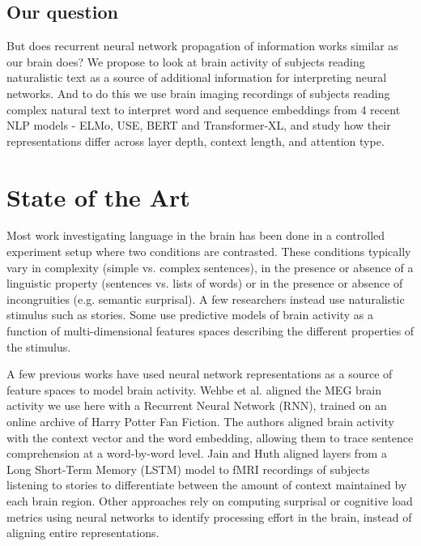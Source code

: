 \documentclass{article}
\begin{document}
\subsection{Our question}
But does recurrent neural network propagation of information works similar as our brain does? We propose to look at brain activity of subjects reading naturalistic text as a source of additional information for interpreting neural networks. And to do this we use brain imaging recordings of subjects reading complex natural text to interpret word and sequence embeddings from 4 recent NLP models - ELMo, USE, BERT and Transformer-XL, and study how their representations differ across layer depth, context length, and attention type.

\section{State of the Art}
\label{sec:state_of_the_art}

Most work investigating language in the brain has been done in a controlled experiment setup where two conditions are contrasted\cite{friederici2011brain}. These conditions typically vary in complexity (simple vs. complex sentences), in the presence or absence of a linguistic property (sentences vs. lists of words) or in the presence or absence of incongruities (e.g. semantic surprisal)\cite{friederici2011brain}. A few researchers instead use naturalistic stimulus such as stories\cite{brennan2012syntactic}. Some use predictive models of brain activity as a function of multi-dimensional features spaces describing the different properties of the stimulus\cite{wehbe2014simultaneously}.

A few previous works have used neural network representations as a source of feature spaces to model brain activity. Wehbe et al.\cite{wehbe2014simultaneously} aligned the MEG brain activity we use here with a Recurrent Neural Network (RNN), trained on an online archive of Harry Potter Fan Fiction. The authors aligned brain activity with the context vector and the word embedding, allowing them to trace sentence comprehension at a word-by-word level. Jain and Huth\cite{jain2018incorporating} aligned layers from a Long Short-Term Memory (LSTM) model to fMRI recordings of subjects listening to stories to differentiate between the amount of context maintained by each brain region. Other approaches rely on computing surprisal or cognitive load metrics using neural networks to identify processing effort in the brain, instead of aligning entire representations\cite{frank2015erp}.
\end{document}
